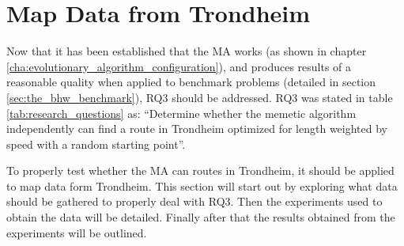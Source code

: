{
\begin{table}[tbph]
\centering
{} %
\caption{The best result obtained from the MA and the known optimal solution for the BHW1 benchmark.}
\label{tab:BHW1_solutions_compared}
\end{table}
}

\section{Map Data from Trondheim}

Now that it has been established that the MA works (as shown in chapter \ref{cha:evolutionary_algorithm_configuration}), and produces results of a reasonable quality when applied to benchmark problems (detailed in section \ref{sec:the_bhw_benchmark}), RQ3 should be addressed. RQ3 was stated in table \ref{tab:research_questions} as: \enquote{Determine whether the memetic algorithm independently can find a route in Trondheim optimized for length weighted by speed with a random starting point}.

To properly test whether the MA can routes in Trondheim, it should be applied to map data form Trondheim. This section will start out by exploring what data should be gathered to properly deal with RQ3. Then the experiments used to obtain the data will be detailed. Finally after that the results obtained from the experiments will be outlined.

